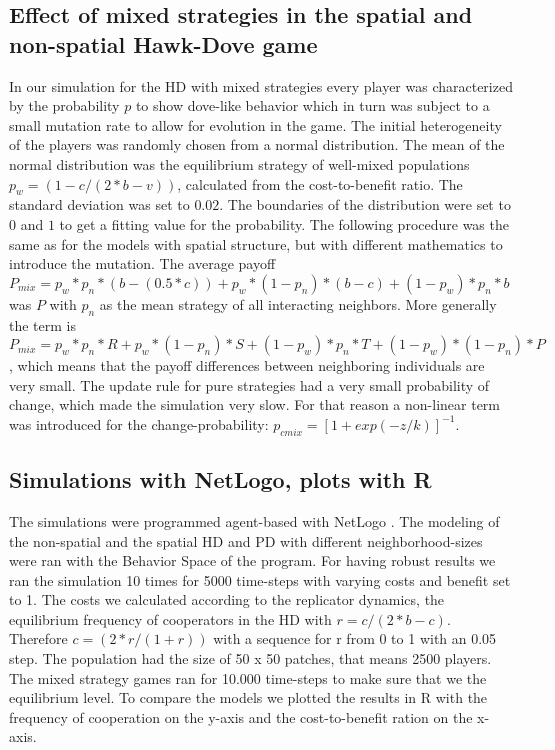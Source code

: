\subsection{Effect of mixed strategies in the spatial and non-spatial Hawk-Dove game}
In our simulation for the HD with mixed strategies every player was characterized by the probability $p$ to show dove-like behavior which in turn was subject to a small mutation rate to allow for evolution in the game. The initial heterogeneity of the players was randomly chosen from a normal distribution. The mean of the normal distribution was the equilibrium strategy of well-mixed populations $p_{w} = (1-c/(2*b-v))$, calculated from the cost-to-benefit ratio. The standard deviation was set to $0.02$. The boundaries of the distribution were set to $0$ and $1$ to get a fitting value for the probability. The following procedure was the same as for the models with spatial structure, but with different mathematics to introduce the mutation. The average payoff $P_{mix} = p_{w}*p_{n}*(b-(0.5*c))+ p_{w}*(1-p_{n})*(b-c)+(1-p_{w})*p_{n}*b$ was $P$ with $p_n$ as the mean strategy of all interacting neighbors. More generally the term is $P_{mix}  = p_{w}*p_{n}*R+ p_{w}*(1-p_{n})*S+(1-p_{w})*p_{n}*T+(1-p_{w})*(1-p_{n})*P$, which means that the payoff differences between neighboring individuals are very small. The update rule for pure strategies had a very small probability of change, which made the simulation very slow. For that reason a non-linear term was introduced for the change-probability: $p_{cmix} = [1 + exp(-z/k)]^{-1}$.

\subsection{Simulations with NetLogo, plots with R}
The simulations were programmed agent-based with NetLogo \citep{Wilensky1999}. The modeling of the non-spatial and the spatial HD and PD with different neighborhood-sizes were ran with the Behavior Space of the program. For having robust results we ran the simulation 10 times for 5000 time-steps with varying costs and benefit set to 1. The costs we calculated according to the replicator dynamics, the equilibrium frequency of cooperators in the HD with $r=c/(2*b-c)$. Therefore $c=(2*r/(1+r))$ with a sequence for r from 0 to 1 with an 0.05 step. The population had the size  of 50 x 50 patches, that means 2500 players. The mixed strategy games ran for 10.000 time-steps to make sure that we the equilibrium level. To compare the models we plotted the results in R \citep{R} with the frequency of cooperation on the y-axis and the cost-to-benefit ration on the x-axis. 

